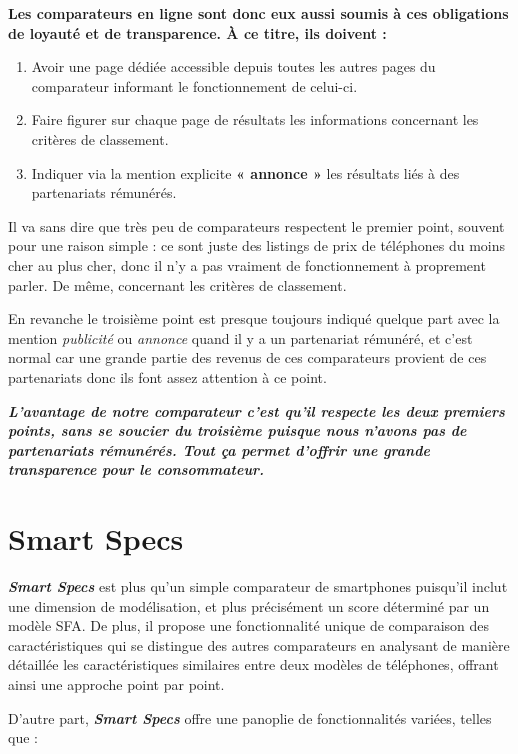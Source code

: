 \documentclass[
  12pt,
]{report}
\begin{document}
\textbf{Les comparateurs en ligne sont donc eux aussi soumis à ces
obligations de loyauté et de transparence. À ce titre, ils doivent :}

\begin{enumerate}
\def\labelenumi{\arabic{enumi}.}
\item
  Avoir une page dédiée accessible depuis toutes les autres pages du
  comparateur informant le fonctionnement de celui-ci.
\item
  Faire figurer sur chaque page de résultats les informations concernant
  les critères de classement.
\item
  Indiquer via la mention explicite \textbf{« annonce »} les résultats
  liés à des partenariats rémunérés.
\end{enumerate}

Il va sans dire que très peu de comparateurs respectent le premier
point, souvent pour une raison simple : ce sont juste des listings de
prix de téléphones du moins cher au plus cher, donc il n'y a pas
vraiment de fonctionnement à proprement parler. De même, concernant les
critères de classement.

En revanche le troisième point est presque toujours indiqué quelque part
avec la mention \emph{publicité} ou \emph{annonce} quand il y a un
partenariat rémunéré, et c'est normal car une grande partie des revenus
de ces comparateurs provient de ces partenariats donc ils font assez
attention à ce point.

\textbf{\emph{L'avantage de notre comparateur c'est qu'il respecte les
deux premiers points, sans se soucier du troisième puisque nous n'avons
pas de partenariats rémunérés. Tout ça permet d'offrir une grande
transparence pour le consommateur.}}

\section{Smart Specs}\label{smart-specs}

\textbf{\emph{Smart Specs}} est plus qu'un simple comparateur de
smartphones puisqu'il inclut une dimension de modélisation, et plus
précisément un score déterminé par un modèle SFA. De plus, il propose
une fonctionnalité unique de comparaison des caractéristiques qui se
distingue des autres comparateurs en analysant de manière détaillée les
caractéristiques similaires entre deux modèles de téléphones, offrant
ainsi une approche point par point.

D'autre part, \textbf{\emph{Smart Specs}} offre une panoplie de
fonctionnalités variées, telles que :
\end{document}
